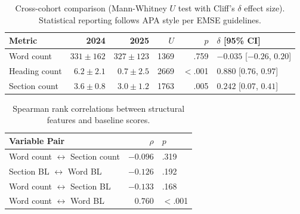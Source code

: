 \begin{table}[htbp]
\caption{Cross-cohort comparison (Mann-Whitney $U$ test with Cliff's $\delta$ effect size). Statistical reporting follows APA style per EMSE guidelines.}
\label{tab:cohort}
\centering
\begin{tabular}{lrrrrl}
\toprule
\textbf{Metric} & \textbf{2024} & \textbf{2025} & $U$ & $p$ & $\delta$ [95\% CI] \\
\midrule
Word count & $331 \pm 162$ & $327 \pm 123$ & 1369 & .759 & $-0.035$ [$-0.26$, $0.20$] \\
Heading count & $6.2 \pm 2.1$ & $0.7 \pm 2.5$ & 2669 & $<$.001 & $0.880$ [$0.76$, $0.97$] \\
Section count & $3.6 \pm 0.8$ & $3.0 \pm 1.2$ & 1763 & .005 & $0.242$ [$0.07$, $0.41$] \\
\bottomrule
\end{tabular}
\end{table}


\begin{table}[htbp]
\caption{Spearman rank correlations between structural features and baseline scores.}
\label{tab:correlations}
\centering
\begin{tabular}{lrl}
\toprule
\textbf{Variable Pair} & $\rho$ & $p$ \\
\midrule
Word count $\leftrightarrow$ Section count & $-0.096$ & .319 \\
Section BL $\leftrightarrow$ Word BL & $-0.126$ & .192 \\
Word count $\leftrightarrow$ Section BL & $-0.133$ & .168 \\
Word count $\leftrightarrow$ Word BL & $0.760$ & $<$.001 \\
\bottomrule
\end{tabular}
\end{table}

